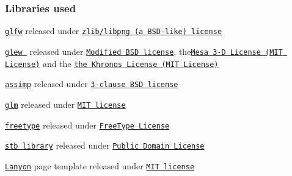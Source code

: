 \subsubsection*{{\bfseries Libraries used}}




\begin{DoxyItemize}
\item \href{http://www.glfw.org}{\tt glfw} released under \href{v}{\tt zlib/libpng (a B\+S\+D-\/like) license} 
\item \href{https://github.com/omniavinco/glew-cmake}{\tt glew } released under \href{http://glew.sourceforge.net/glew.txt}{\tt Modified B\+S\+D license}, the\href{http://glew.sourceforge.net/mesa.txt}{\tt Mesa 3-\/\+D License (M\+I\+T License)} and the \href{http://glew.sourceforge.net/khronos.txt}{\tt the Khronos License (M\+I\+T License)} 
\item \href{http://assimp.sourceforge.net/}{\tt assimp} released under \href{http://assimp.sourceforge.net/main_license.html}{\tt 3-\/clause B\+S\+D license} 
\item \href{http://glm.g-truc.net}{\tt glm} released under \href{http://glm.g-truc.net/copying.txt}{\tt M\+I\+T license}  
\item \href{http://www.freetype.org}{\tt freetype} released under \href{http://git.savannah.gnu.org/cgit/freetype/freetype2.git/tree/docs/FTL.TXT}{\tt Free\+Type License} 
\item \href{https://github.com/nothings/stb}{\tt stb library} released under \href{https://github.com/nothings/stb/blob/master/README.md#whats-the-license}{\tt Public Domain License} 
\item \href{https://github.com/poole/lanyon}{\tt Lanyon} page template released under \href{https://github.com/poole/lanyon/blob/master/LICENSE.md}{\tt M\+I\+T license} 
\end{DoxyItemize}